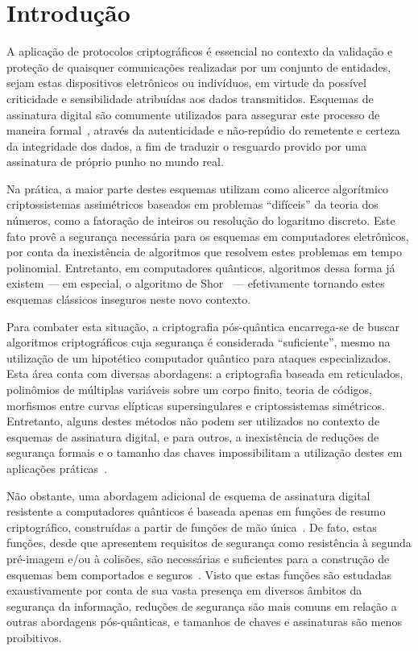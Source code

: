 \documentclass{ufsctex/ufsctex}
\begin{document}
\capa{}
\pretextuais{}
\listadefiguras{}
\listadetabelas{}
\listadeabreviaturas{}
\listadesimbolos{}
\listadealgoritmos{}
\sumario{}

\chapter{Introdução}\label{chapter:intro}

A aplicação de protocolos criptográficos é essencial no contexto da validação e
proteção de quaisquer comunicações realizadas por um conjunto de entidades,
sejam estas dispositivos eletrônicos ou indivíduos, em virtude da possível
criticidade e sensibilidade atribuídas aos dados transmitidos. Esquemas de
assinatura digital são comumente utilizados para assegurar este processo de
maneira formal~\cite[Seção 6.1]{Goldreich:book:2004}, através da autenticidade
e não-repúdio do remetente e certeza da integridade dos dados, a fim de
traduzir o resguardo provido por uma assinatura de próprio punho no mundo real.

Na prática, a maior parte destes esquemas utilizam como alicerce algorítmico
criptossistemas assimétricos baseados em problemas ``difíceis'' da teoria dos
números, como a fatoração de inteiros ou resolução do logaritmo discreto. Este
fato provê a segurança necessária para os esquemas em computadores eletrônicos,
por conta da inexistência de algoritmos que resolvem estes problemas em tempo
polinomial. Entretanto, em computadores quânticos, algoritmos dessa forma já
existem --- em especial, o algoritmo de Shor~\cite{Shor:article:1997:oct} ---
efetivamente tornando estes esquemas clássicos inseguros neste novo contexto.

Para combater esta situação, a criptografia pós-quântica encarrega-se de buscar
algoritmos criptográficos cuja segurança é considerada ``suficiente'', mesmo na
utilização de um hipotético computador quântico para ataques especializados.
Esta área conta com diversas abordagens: a criptografia baseada em reticulados,
polinômios de múltiplas variáveis sobre um corpo finito, teoria de códigos,
morfismos entre curvas elípticas supersingulares e criptossistemas simétricos.
Entretanto, alguns destes métodos não podem ser utilizados no contexto de
esquemas de assinatura digital, e para outros, a inexistência de reduções de
segurança formais e o tamanho das chaves impossibilitam a utilização destes em
aplicações práticas~\cite{Bernstein:article:2017:sep}.

Não obstante, uma abordagem adicional de esquema de assinatura digital
resistente a computadores quânticos é baseada apenas em funções de resumo
criptográfico, construídas a partir de funções de mão
única~\cite{Katz:misc:2005:sep}. De fato, estas funções, desde que apresentem
requisitos de segurança como resistência à segunda pré-imagem e/ou à colisões,
são necessárias e suficientes para a construção de esquemas bem comportados e
seguros~\cite{Rompel:inproc:1990:may}. Visto que estas funções são estudadas
exaustivamente por conta de sua vasta presença em diversos âmbitos da segurança
da informação, reduções de segurança são mais comuns em relação a outras
abordagens pós-quânticas, e tamanhos de chaves e assinaturas são menos
proibitivos.
\end{document}
